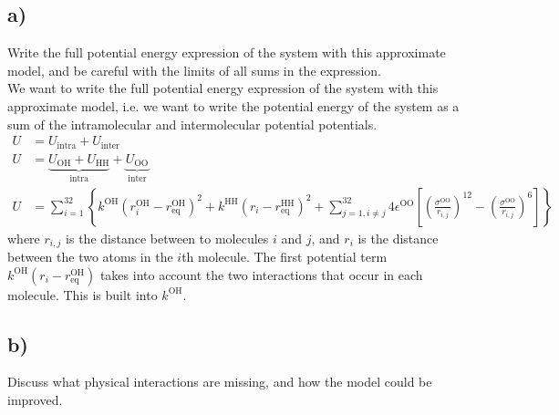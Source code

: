 \documentclass[a4paper]{article}
\newcommand{\nl}{\\\newline\noindent}
\begin{document}
\subsection*{a)}
Write the full potential energy expression of the system with this approximate model, and be careful with the limits of all sums in the expression.
\nl
We want to write the full potential energy expression of the system with this approximate model, i.e. we want to write the potential energy of the system as a sum of the intramolecular and intermolecular potential potentials.
\begin{align*}
    U &= U_{\text{intra}} + U_{\text{inter}}\\
    U &= \underbrace{U_{\text{OH}} + U_{\text{HH}}}_{\text{intra}} + \underbrace{U_{\text{OO}}}_{\text{inter}}\\
    U &= \sum_{i = 1}^{32}\left\{k^{\text{OH}}\left(r_i^{\text{OH}} - r_{\text{eq}}^\text{OH}\right)^2 + k^{\text{HH}}\left(r_i - r_{\text{eq}}^{\text{HH}}\right)^2 + \sum_{j = 1, i \neq j}^{32}4\epsilon^{\text{OO}}\left[\left(\frac{\sigma^{\text{OO}}}{r_{i,j}}\right)^{12} - \left(\frac{\sigma^{\text{OO}}}{r_{i,j}}\right)^6\right]\right\}
\end{align*}where $r_{i,j}$ is the distance between to molecules $i$ and $j$, and $r_i$ is the distance between the two atoms in the $i$th molecule. The first potential term $k^{\text{OH}}\left(r_i - r_{\text{eq}}^{\text{OH}}\right)$ takes into account the two interactions that occur in each molecule. This is built into $k^{\text{OH}}$.

\subsection*{b)}
Discuss what physical interactions are missing, and how the model could be improved.
\end{document}
